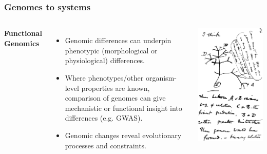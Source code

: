 %
\begin{frame}
  \frametitle{Genomes to systems}
    \begin{columns}[c] 
        \textcolor{RawSienna}{\textbf{Functional Genomics}}
        \begin{itemize}
         \item \textcolor{hutton_green}{Genomic differences can underpin phenotypic (morphological or physiological) differences.}
         \item Where phenotypes/other organism-level properties are known, comparison of genomes can give mechanistic or functional insight into differences (e.g. GWAS).
         \item \textcolor{hutton_blue}{Genomic changes reveal evolutionary processes and constraints.}
        \end{itemize}
        \includegraphics[width=\textwidth]{images/darwin_tree}
    \end{columns}  
\end{frame}

